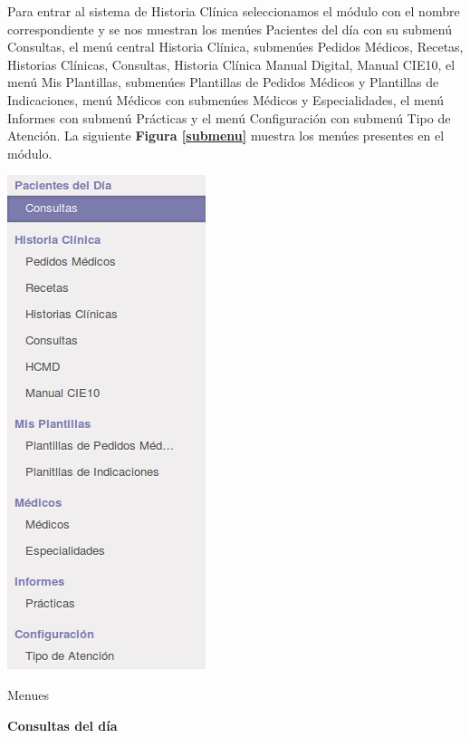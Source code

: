 Para entrar al sistema de Historia Clínica seleccionamos el módulo con el nombre correspondiente y se nos muestran los menúes Pacientes del día con su submenú Consultas, el menú central Historia Clínica, submenúes Pedidos Médicos, Recetas, Historias Clínicas, Consultas, Historia Clínica Manual Digital, Manual CIE10, el menú Mis Plantillas, submenúes Plantillas de Pedidos Médicos y Plantillas de Indicaciones, menú Médicos con submenúes Médicos y Especialidades, el menú Informes con submenú Prácticas y el menú Configuración con submenú Tipo de Atención. La siguiente \textbf{Figura \ref{submenu}} muestra los menúes presentes en el módulo.

\begin{correccionFigure}[h]
      \centering
      \includegraphics[height=.3\textheight]{img/tp1/HE/MenuHC}
      \caption{Menues}
      \label{submenu}
\end{correccionFigure}


\textbf{Consultas del día}

